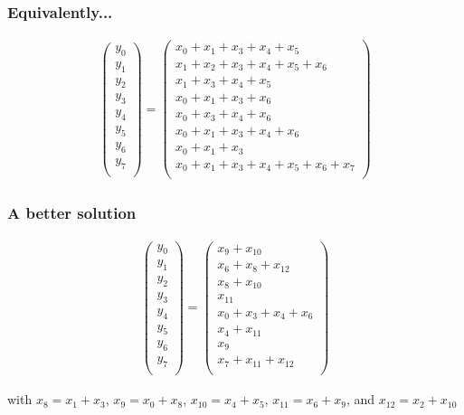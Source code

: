 \documentclass[handout]{beamer}
\begin{document}
\begin{frame}
	\frametitle{Equivalently...}
\begin{align*}
\begin{pmatrix}
y_0 \\
y_1 \\
y_2 \\
y_3 \\
y_4 \\
y_5 \\
y_6 \\
y_7 \\
\end{pmatrix} = 
\begin{pmatrix}
x_0 + x_1 + x_3 + x_4 + x_5 \\
x_1 + x_2 + x_3 + x_4 + x_5 + x_6 \\
x_1 + x_3 + x_4 + x_5 \\
x_0 + x_1 + x_3 + x_6 \\
x_0 + x_3 + x_4 + x_6 \\
x_0 + x_1 + x_3 + x_4 + x_6 \\
x_0 + x_1 + x_3 \\
x_0 + x_1 + x_3 + x_4 + x_5 + x_6 + x_7 \\
\end{pmatrix}
\end{align*}
\end{frame}

\begin{frame}
	\frametitle{A better solution}
\begin{align*}
\begin{pmatrix}
y_0 \\
y_1 \\
y_2 \\
y_3 \\
y_4 \\
y_5 \\
y_6 \\
y_7 \\
\end{pmatrix} = 
\begin{pmatrix}
x_9 + x_{10} \\
x_6 + x_8 + x_{12} \\
x_8 + x_{10} \\
x_{11} \\
x_0 + x_3 + x_4 + x_6 \\
x_4 + x_{11} \\
x_9 \\
x_7 + x_{11} + x_{12} \\
\end{pmatrix}
\end{align*}

with $x_8 = x_1 + x_3$, $x_9 = x_0 + x_8$, $x_{10} = x_4 + x_5$, $x_{11} = x_6 + x_9$, and $x_{12} = x_2 + x_{10}$

\end{frame}
\end{document}
